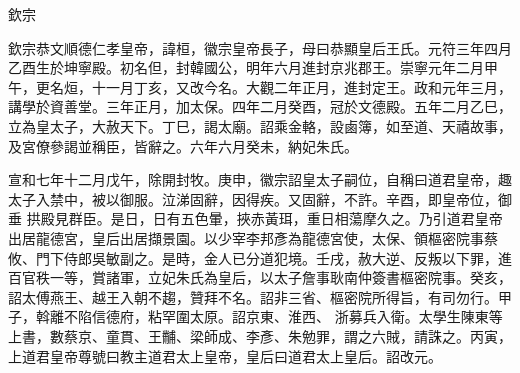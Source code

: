 
\begin{pinyinscope}

 欽宗



 欽宗恭文順德仁孝皇帝，諱桓，徽宗皇帝長子，母曰恭顯皇后王氏。元符三年四月乙酉生於坤寧殿。初名但，封韓國公，明年六月進封京兆郡王。崇寧元年二月甲
 午，更名烜，十一月丁亥，又改今名。大觀二年正月，進封定王。政和元年三月，講學於資善堂。三年正月，加太保。四年二月癸酉，冠於文德殿。五年二月乙巳，立為皇太子，大赦天下。丁巳，謁太廟。詔乘金輅，設鹵簿，如至道、天禧故事，及宮僚參謁並稱臣，皆辭之。六年六月癸未，納妃朱氏。



 宣和七年十二月戊午，除開封牧。庚申，徽宗詔皇太子嗣位，自稱曰道君皇帝，趣太子入禁中，被以御服。泣涕固辭，因得疾。又固辭，不許。辛酉，即皇帝位，御垂
 拱殿見群臣。是日，日有五色暈，挾赤黃珥，重日相蕩摩久之。乃引道君皇帝出居龍德宮，皇后出居擷景園。以少宰李邦彥為龍德宮使，太保、領樞密院事蔡攸、門下侍郎吳敏副之。是時，金人已分道犯境。壬戌，赦大逆、反叛以下罪，進百官秩一等，賞諸軍，立妃朱氏為皇后，以太子詹事耿南仲簽書樞密院事。癸亥，詔太傅燕王、越王入朝不趨，贊拜不名。詔非三省、樞密院所得旨，有司勿行。甲子，斡離不陷信德府，粘罕圍太原。詔京東、淮西、
 浙募兵入衛。太學生陳東等上書，數蔡京、童貫、王黼、梁師成、李彥、朱勉罪，謂之六賊，請誅之。丙寅，上道君皇帝尊號曰教主道君太上皇帝，皇后曰道君太上皇后。詔改元。




\end{pinyinscope}
